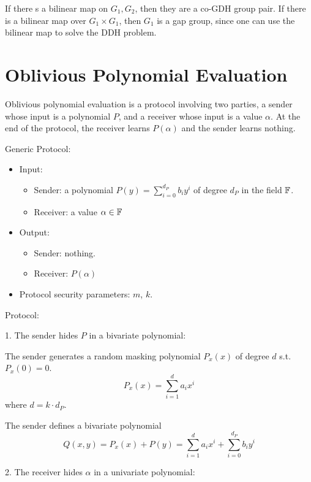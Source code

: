 \remk If there s a bilinear map on $G_1, G_2$, then they are a co-GDH group pair. If there is a bilinear map over $G_1 \times G_1$, then $G_1$ is a gap group, since one can use the bilinear map to solve the DDH problem.

\section{Oblivious Polynomial Evaluation}

Oblivious polynomial evaluation is a protocol involving two parties, a sender whose input is a polynomial $P$, and a receiver whose input is a value $\alpha$. At the end of the protocol, the receiver learns $P(\alpha)$ and the sender learns nothing.

Generic Protocol:

\begin{itemize}
    \item Input:
    
    \begin{itemize}
        \item Sender: a polynomial $P(y) = \sum_{i=0}^{d_P} b_i y^i$ of degree $d_P$ in the field ${\mathbb F}$.
        \item Receiver: a value $\alpha \in {\mathbb F}$
    \end{itemize}
    
    \item Output:
    
    \begin{itemize}
        \item Sender: nothing.
        \item Receiver: $P(\alpha)$
    \end{itemize}
    
    \item Protocol security parameters: $m$, $k$.
    
\end{itemize}

Protocol:

1. The sender hides $P$ in a bivariate polynomial:

The sender generates a random masking polynomial $P_x (x)$ of degree $d$ s.t. $P_x (0) = 0$.
$$P_x (x) = \sum_{i=1}^{d} a_i x^i$$
where $d = k \cdot d_P$.

The sender defines a bivariate polynomial
$$ Q(x,y) = P_x(x) + P(y) = \sum_{i=1}^{d} a_i x^i + \sum_{i=0}^{d_P} b_i y^i $$

2. The receiver hides $\alpha$ in a univariate polynomial:

